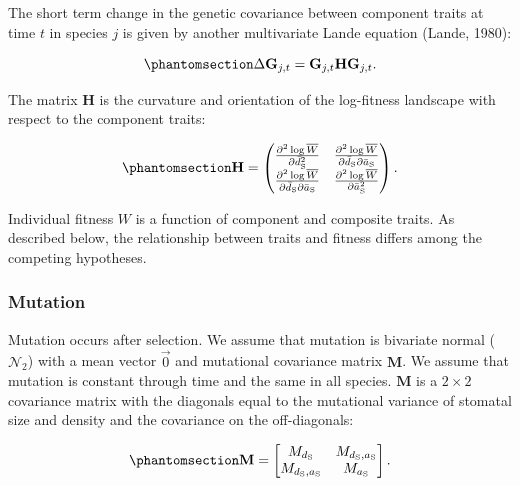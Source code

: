\documentclass[
  letterpaper,
  DIV=11,
  numbers=noendperiod]{scrartcl}
\begin{document}
The short term change in the genetic covariance between component traits
at time \(t\) in species \(j\) is given by another multivariate Lande
equation (Lande, 1980):

\begin{equation}\phantomsection\label{eq-dG}{\Delta \mathbf{G}_{j,t} = \mathbf{G}_{j,t} \mathbf{H} \mathbf{G}_{j,t}.}\end{equation}

The matrix \(\mathbf{H}\) is the curvature and orientation of the
log-fitness landscape with respect to the component traits:

\begin{equation}\phantomsection\label{eq-H}{\mathbf{H} = \begin{pmatrix} \frac{\partial^2 \log \overline{W}}{\partial \bar{d}^2_\mathrm{S}} & \frac{\partial^2 \log \overline{W}}{\partial \bar{d}_\mathrm{S} \partial \bar{a}_{\mathrm{S}}} \\ \frac{\partial^2 \log \overline{W}}{\partial \bar{d}_\mathrm{S} \partial \bar{a}_\mathrm{S}} & \frac{\partial^2 \log \overline{W}}{\partial \bar{a}^2_\mathrm{S}}  \end{pmatrix}.}\end{equation}

Individual fitness \(W\) is a function of component and composite
traits. As described below, the relationship between traits and fitness
differs among the competing hypotheses.

\subsubsection{Mutation}\label{mutation}

Mutation occurs after selection. We assume that mutation is bivariate
normal (\(\mathcal{N}_2\)) with a mean vector \(\vec{0}\) and mutational
covariance matrix \(\mathbf{M}\). We assume that mutation is constant
through time and the same in all species. \(\mathbf{M}\) is a
\(2 \times 2\) covariance matrix with the diagonals equal to the
mutational variance of stomatal size and density and the covariance on
the off-diagonals:

\begin{equation}\phantomsection\label{eq-M}{\mathbf{M} = \begin{bmatrix} M_{d_\mathrm{S}} & M_{d_\mathrm{S},a_\mathrm{S}} \\ M_{d_\mathrm{S},a_\mathrm{S}} & M_{a_\mathrm{S}} \end{bmatrix}.}\end{equation}
\end{document}
